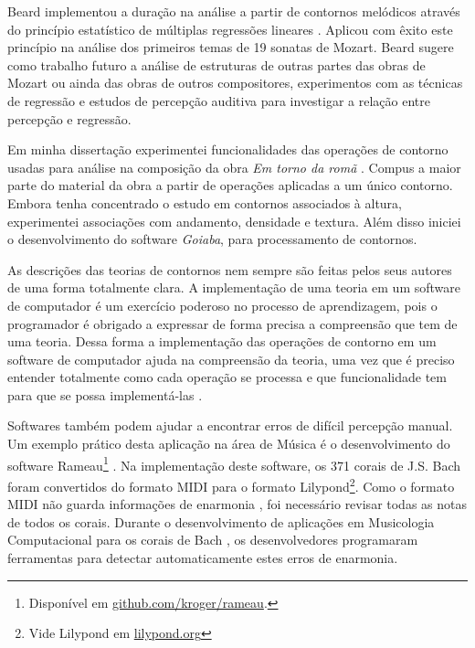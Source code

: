 \documentclass[12pt]{article}
\newcommand{\goiaba}[0]{\textit{Goiaba}}
\newcommand{\obra}[0]{\textit{Em torno da romã}}
\begin{document}

Beard implementou a duração na análise a partir de contornos melódicos
através do princípio estatístico de múltiplas regressões lineares
\cite{beard03:contour}. Aplicou com êxito este princípio na análise
dos primeiros temas de 19 sonatas de Mozart. Beard sugere como
trabalho futuro a análise de estruturas de outras partes das obras de
Mozart ou ainda das obras de outros compositores, experimentos com as
técnicas de regressão e estudos de percepção auditiva para investigar
a relação entre percepção e regressão.


Em minha dissertação experimentei funcionalidades das operações de
contorno usadas para análise na composição da obra \obra{}
\cite{sampaio08:em}. Compus a maior parte do material da obra a partir
de operações aplicadas a um único contorno. Embora tenha concentrado o
estudo em contornos associados à altura, experimentei associações com
andamento, densidade e textura. Além disso iniciei o desenvolvimento
do software \goiaba{}, para processamento de contornos.


As descrições das teorias de contornos nem sempre são feitas pelos
seus autores de uma forma totalmente clara. A implementação de uma
teoria em um software de computador é um exercício poderoso no
processo de aprendizagem, pois o programador é obrigado a expressar de
forma precisa a compreensão que tem de uma teoria. Dessa forma a
implementação das operações de contorno em um software de computador
ajuda na compreensão da teoria, uma vez que é preciso entender
totalmente como cada operação se processa e que funcionalidade tem
para que se possa implementá-las \cite{sampaio08:em}.

Softwares também podem ajudar a encontrar erros de difícil percepção
manual. Um exemplo prático desta aplicação na área de Música é o
desenvolvimento do software Rameau\footnote{Disponível em
  \url{github.com/kroger/rameau}.}
\cite{kroger08:rameau,passos.ea09:functional}. Na implementação deste
software, os 371 corais de J.S. Bach foram convertidos do formato MIDI
para o formato Lilypond\footnote{Vide Lilypond em
  \url{lilypond.org}}. Como o formato MIDI não guarda informações de
enarmonia \cite{selfridge-field97:beyond}, foi necessário revisar
todas as notas de todos os corais. Durante o desenvolvimento de
aplicações em Musicologia Computacional para os corais de Bach
\cite{kroger08:musicologia}, os desenvolvedores programaram
ferramentas para detectar automaticamente estes erros de enarmonia.
\end{document}
